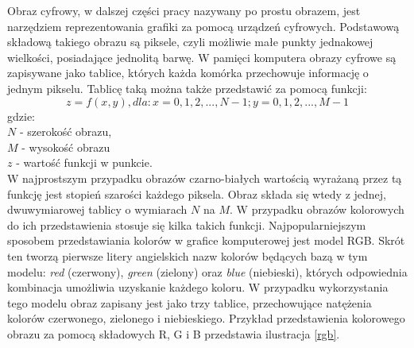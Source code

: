 Obraz cyfrowy, w dalszej części pracy nazywany po prostu obrazem, jest narzędziem reprezentowania grafiki za pomocą urządzeń cyfrowych. Podstawową składową takiego obrazu są piksele, czyli możliwie małe punkty jednakowej wielkości, posiadające jednolitą barwę. W pamięci komputera obrazy cyfrowe są zapisywane jako tablice, których każda komórka przechowuje informację o jednym pikselu. Tablicę taką można także przedstawić za pomocą funkcji:
\begin{equation}
\label{funkcja_obrazu}
z = f(x,y), dla: x = 0, 1, 2, ..., N-1; y = 0, 1, 2, ..., M-1
\end{equation}
gdzie:\\
$N$ - szerokość obrazu,\\
$M$ - wysokość obrazu\\
$z$ - wartość funkcji w punkcie.\\
W najprostszym przypadku obrazów czarno-białych wartością wyrażaną przez tą funkcję jest stopień szarości każdego piksela. Obraz składa się wtedy z jednej, dwuwymiarowej tablicy o wymiarach $N$ na $M$.
W przypadku obrazów kolorowych do ich przedstawienia stosuje się kilka takich funkcji. Najpopularniejszym sposobem przedstawiania kolorów w grafice komputerowej jest model RGB. Skrót ten tworzą pierwsze litery angielskich nazw kolorów będących bazą w tym modelu: \textit{red} (czerwony), \textit{green} (zielony) oraz \textit{blue} (niebieski), których odpowiednia kombinacja umożliwia uzyskanie każdego koloru. W przypadku wykorzystania tego modelu obraz zapisany jest jako trzy tablice, przechowujące natężenia kolorów czerwonego, zielonego i niebieskiego. Przykład przedstawienia kolorowego obrazu za pomocą składowych R, G i B przedstawia ilustracja \ref{rgb}.

